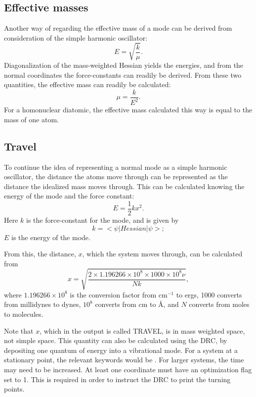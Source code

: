 \subsection{Effective masses}
Another way of regarding the effective mass of a mode can be derived from
consideration of the simple harmonic oscillator:
$$
   E =  \sqrt{\frac{k}{\mu}}.
$$
Diagonalization of the mass-weighted Hessian yields the energies, and from the
normal coordinates the force-constants can readily be derived.  From these two
quantities, the effective mass can readily be calculated:
$$
\mu = \frac{k}{E^2}.
$$
For a homonuclear diatomic, the effective mass calculated this way is equal
to the mass of one atom.

\subsection{Travel}
To continue the idea of representing a normal mode as a simple harmonic
oscillator, the distance the atoms move through can be represented as the
distance the idealized mass moves through.  This can be calculated knowing the
energy of the mode and the force constant:
$$
     E = \frac{1}{2}kx^2.
$$
Here $k$ is the force-constant for the mode, and is given by
$$
k = <\psi|Hessian|\psi>;
$$
$E$ is the energy of the mode.

From this, the distance, $x$, which the system moves through, can be calculated
from
$$
x =\sqrt{\frac{2\times 1.196266\times 10^8 \times 1000 \times 10^8 \nu}{N k}},
$$
where $1.196266\times 10^8$ is the conversion factor from cm$^{-1}$ to ergs,
1000 converts from millidynes to dynes, $10^8$ converts from cm to \AA , and
$N$ converts from moles to molecules.

Note that $x$, which in the output is called TRAVEL, is in mass weighted
space, not simple space.  This quantity can also be calculated using the DRC,
by depositing one quantum of energy into a vibrational mode.  For a system at a
stationary point, the relevant keywords would be .  For
larger systems, the time may need to be increased.  At least one coordinate
must have an optimization flag set to 1.  This is required in order to instruct
the DRC to print the turning points. 
